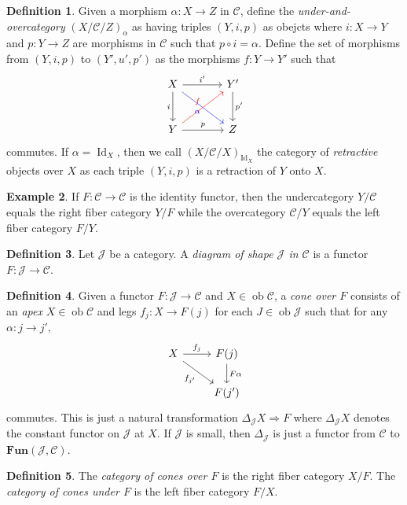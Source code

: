 \documentclass[10pt,letterpaper,cm]{nupset}
\theoremstyle{definition}
\newtheorem{definition}{Definition}
\newtheorem{exmp}[definition]{Example}
\theoremstyle{theorem}
\theoremstyle{remark}
\newcommand{\1}{\mathbf{1}}
\renewcommand{\c}{\mathscr{C}}
\renewcommand{\j}{\mathscr{J}}
\newcommand{\0}{\vec 0}
\DeclareMathOperator{\id}{Id}
\DeclareMathOperator{\ob}{ob}
\begin{document}
\begin{definition}
Given a morphism $\alpha : X \to Z$ in $\c$, define the \textit{under-and-overcategory} $(X/\c/Z)_{\alpha}$ as having triples $(Y, i, p)$ as obejcts where $i : X \to Y$ and $p: Y \to Z$ are morphisms in $\c$ such that $p\circ i = \alpha$. Define the set of morphisms from $(Y, i, p)$ to $(Y', u', p')$ as the morphisms $f: Y \to Y'$ such that 
\[
\begin{tikzcd}[row sep=large, column sep=large]
X \arrow[to=Z, "i ", swap] \arrow[to=2-2, dr, blue, "\alpha", swap]
& Y' \arrow[to=2-2, "p' "] \\
|[alias=Z]| Y \arrow[to=1-2, ur, red, "f"] \arrow[to=2-2, "p"] 
& Z
\arrow[from=ul, to=1-2, "i' "]
\end{tikzcd}
\]
commutes. If $\alpha = \id_X$, then we call $(X/\c/X)_{\id_X}$ the category of \textit{retractive} objects over $X$ as each triple $(Y, i, p)$ is a retraction of $Y$ onto $X$.
\end{definition}

\begin{exmp}
If $F: \c \to \c$ is the identity functor, then the undercategory $Y/\c$ equals the right fiber category $Y/F$ while the overcategory $\c/Y$ equals the left fiber category $F/Y$.
\end{exmp}

\begin{definition}
Let $\j$ be a category. A \textit{diagram of shape $\j$ in $\c$} is a functor $F: \j \to \c$.
\end{definition}

\begin{definition}
Given a functor $F: \j \to \c$ and $X \in \ob \c$, a \textit{cone over $F$} consists of an \textit{apex} $X\in \ob \c$ and legs $f_j : X \to F(j)$ for each $J \in \ob \j$ such that for any $\alpha : j \to j'$, 
\[ \begin{tikzcd}
X \arrow[r, "f_j"] \arrow[swap, dr,  " f_{j'} "] & F(j) \arrow[d, "F\alpha"] \\%
 & F(j')
\end{tikzcd}
\]
commutes. This is just a natural transformation $\Delta_{\j} X \Rightarrow F$ where $\Delta_{\j} X$ denotes the constant functor on $\j$ at $X$. If $\j$ is small, then $\Delta_{\j}$ is just a functor from $\c$ to $\mathbf{Fun}(\j, \c)$.
\end{definition}

\begin{definition}
The \textit{category of cones over $F$} is the right fiber category $X/F$. The \textit{category of cones under $F$} is the left fiber category  $F/X$.
\end{definition}
\end{document}
